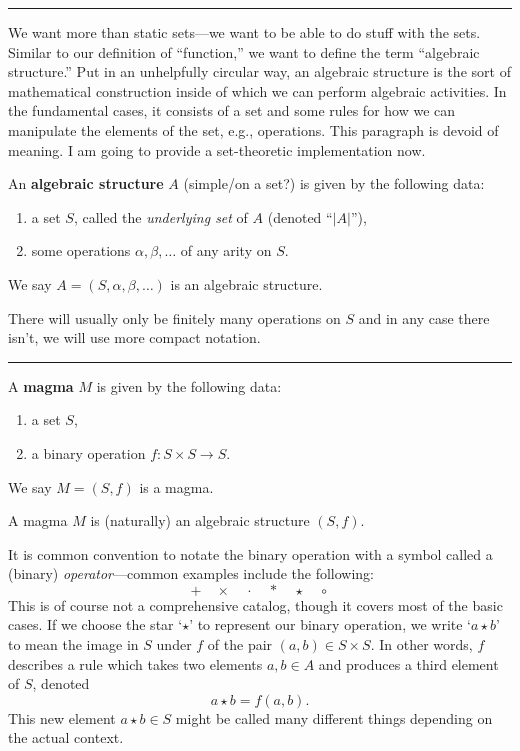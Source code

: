 \documentclass[12pt]{article}
\newcommand{\keyword}[1]{\textbf{#1}}
\newcommand{\sepline}{\rule{\textwidth}{0.4pt}}
\theoremstyle{definition}
\newcommand{\<}{\left\langle}
\renewcommand{\>}{\right\rangle}
\begin{document}
\sepline

We want more than static sets---we want to be able to do stuff with the sets.
Similar to our definition of ``function,'' we want to define the term ``algebraic structure.''
Put in an unhelpfully circular way, an algebraic structure is the sort of mathematical construction inside of which we can perform algebraic activities.
In the fundamental cases, it consists of a set and some rules for how we can manipulate the elements of the set, e.g., operations.
This paragraph is devoid of meaning.
I am going to provide a set-theoretic implementation now.


An \keyword{algebraic structure} $A$ (simple/on a set?) is given by the following data:
\begin{enumerate}
    \item a set $S$, called the \emph{underlying set} of $A$ (denoted ``$|A|$''),
    \item some operations $\alpha, \beta, \dots$ of any arity on $S$.
\end{enumerate}
We say $A = (S, \alpha, \beta, \dots)$ is an algebraic structure.

There will usually only be finitely many operations on $S$ and in any case there isn't, we will use more compact notation.

\sepline



A \keyword{magma} $M$ is given by the following data:
\begin{enumerate}[$\bullet$]
    \item a set $S$,
    \item a binary operation $f : S \times S \to S$.
\end{enumerate}
We say $M = (S, f)$ is a magma.

A magma $M$ is (naturally) an algebraic structure $(S, f)$.

It is common convention to notate the binary operation with a symbol called a (binary) \emph{operator}---common examples include the following:
\[
    + \quad \times \quad \cdot \quad * \quad \star \quad \circ
\]
This is of course not a comprehensive catalog, though it covers most of the basic cases.
If we choose the star `$\star$' to represent our binary operation, we write `$a \star b$' to mean the image in $S$ under $f$ of the pair $(a, b) \in S \times S$.
In other words, $f$ describes a rule which takes two elements $a, b \in A$ and produces a third element of $S$, denoted 
\[
    a \star b = f(a, b).
\]
This new element $a \star b \in S$ might be called many different things depending on the actual context.
\end{document}
